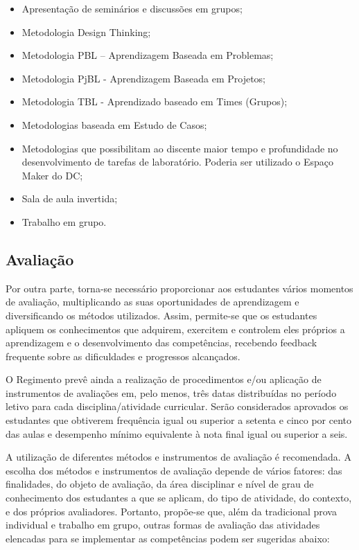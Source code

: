 
\begin{itemize}
    \item Apresentação de seminários e discussões em grupos;
    \item Metodologia Design Thinking;
    \item Metodologia PBL – Aprendizagem Baseada em Problemas;
    \item Metodologia PjBL - Aprendizagem Baseada em Projetos;
    \item Metodologia TBL - Aprendizado baseado em Times (Grupos);
    \item Metodologias baseada em Estudo de Casos;
    \item Metodologias que possibilitam ao discente maior tempo e profundidade no desenvolvimento de tarefas de laboratório. Poderia ser utilizado o Espaço Maker do DC;
    \item Sala de aula invertida;
    \item Trabalho em grupo.
\end{itemize}

\subsection{Avaliação}\label{sec:avaliacao}

Por outra parte, torna-se necessário proporcionar aos estudantes vários momentos de avaliação, multiplicando as suas oportunidades de aprendizagem e diversificando os métodos utilizados. Assim, permite-se que os estudantes apliquem os conhecimentos que adquirem, exercitem e controlem eles próprios a aprendizagem e o desenvolvimento das competências, recebendo feedback frequente sobre as dificuldades e progressos alcançados.

O Regimento prevê ainda a realização de procedimentos e/ou aplicação de instrumentos de avaliações em, pelo menos, três datas distribuídas no período letivo para cada disciplina/atividade curricular. Serão considerados aprovados os estudantes que obtiverem frequência igual ou superior a setenta e cinco por cento das aulas e desempenho mínimo equivalente à nota final igual ou superior a seis.

A utilização de diferentes métodos e instrumentos de avaliação é recomendada. A escolha dos métodos e instrumentos de avaliação depende de vários fatores: das finalidades, do objeto de avaliação, da área disciplinar e nível de grau de conhecimento dos estudantes a que se aplicam, do tipo de atividade, do contexto, e dos próprios avaliadores. Portanto, propõe-se que, além da tradicional prova individual e trabalho em grupo, outras formas de avaliação das atividades elencadas para se implementar as competências podem ser sugeridas abaixo:

